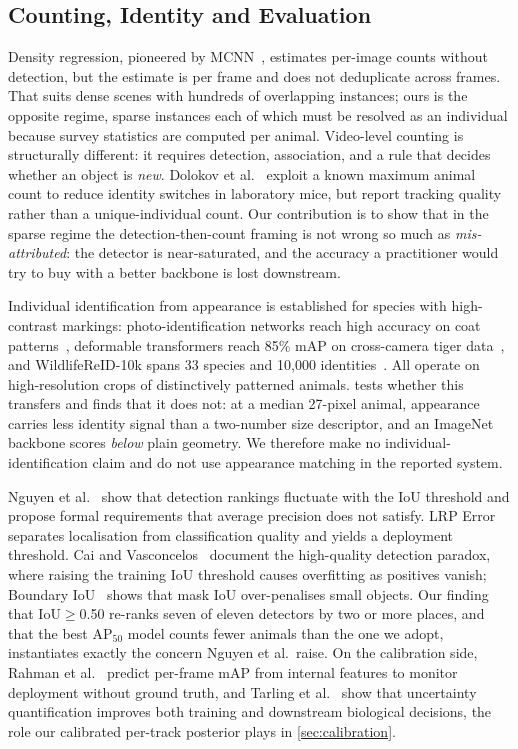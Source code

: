 \subsection{Counting, Identity and Evaluation}

\label{sec:rw:counting}

Density regression, pioneered by MCNN~\cite{zhang2016single}, estimates per-image counts
without detection, but the estimate is per frame and does not deduplicate across frames. That
suits dense scenes with hundreds of overlapping instances; ours is the opposite regime, sparse
instances each of which must be resolved as an individual because survey statistics are
computed per animal. Video-level counting is structurally different: it requires detection,
association, and a rule that decides whether an object is \emph{new}. Dolokov et
al.~\cite{dolokov2023upper} exploit a known maximum animal count to reduce identity switches in
laboratory mice, but report tracking quality rather than a unique-individual count. Our
contribution is to show that in the sparse regime the detection-then-count framing is not wrong
so much as \emph{mis-attributed}: the detector is near-saturated, and the accuracy a
practitioner would try to buy with a better backbone is lost downstream.

Individual identification from appearance is established for species with high-contrast
markings: photo-identification networks reach high accuracy on coat
patterns~\cite{miele2020revisiting}, deformable transformers reach 85\% mAP on cross-camera
tiger data~\cite{li2024redeformtr}, and WildlifeReID-10k spans 33 species and 10{,}000
identities~\cite{adam2025wildlifereid10k}. All operate on high-resolution crops of
distinctively patterned animals.  tests whether this transfers and finds that it
does not: at a median 27-pixel animal, appearance carries less identity signal than a
two-number size descriptor, and an ImageNet backbone scores \emph{below} plain geometry. We
therefore make no individual-identification claim and do not use appearance matching in the
reported system.

Nguyen et al.~\cite{nguyen2023trustworthy} show that detection rankings fluctuate with the IoU
threshold and propose formal requirements that average precision does not satisfy. LRP
Error~\cite{oksuz2022lrp} separates localisation from classification quality and yields a
deployment threshold. Cai and Vasconcelos~\cite{cai2021cascade} document the high-quality
detection paradox, where raising the training IoU threshold causes overfitting as positives
vanish; Boundary IoU~\cite{cheng2021boundary} shows that mask IoU over-penalises small objects.
Our finding that IoU$\geq$0.50 re-ranks seven of eleven detectors by two or more places, and
that the best AP$_{50}$ model counts fewer animals than the one we adopt, instantiates exactly
the concern Nguyen et al.\ raise. On the calibration side, Rahman et
al.~\cite{rahman2021perframe} predict per-frame mAP from internal features to monitor
deployment without ground truth, and Tarling et al.~\cite{tarling2022deep} show that
uncertainty quantification improves both training and downstream biological decisions, the
role our calibrated per-track posterior plays in \cref{sec:calibration}.
\label{sec:othermodalities}

